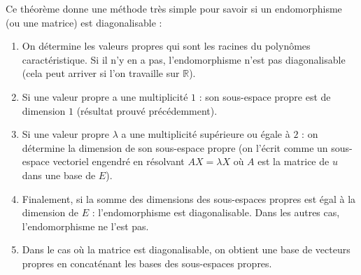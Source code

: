 \documentclass[a4paper,10pt]{report}
\begin{document}
\begin{metho} Ce théorème donne une méthode très simple pour savoir si un endomorphisme (ou une matrice) est diagonalisable :

\begin{enumerate}
\item On détermine les valeurs propres qui sont les racines du polynômes caractéristique. Si il n'y en a pas, l'endomorphisme n'est pas diagonalisable (cela peut arriver si l'on travaille sur $\mathbb{R}$).
\item Si une valeur propre a une multiplicité $1$ : son sous-espace propre est de dimension $1$ (résultat prouvé précédemment).
\item Si une valeur propre $\lambda$ a une multiplicité supérieure ou égale à $2$ : on détermine la dimension de son sous-espace propre (on l'écrit comme un sous-espace vectoriel engendré en résolvant $AX= \lambda X$ où $A$ est la matrice de $u$ dans une base de $E$).
\item Finalement, si la somme des dimensions des sous-espaces propres est égal à la dimension de $E$ : l'endomorphisme est diagonalisable. Dans les autres cas, l'endomorphisme ne l'est pas. 
\item Dans le cas où la matrice est diagonalisable, on obtient une base de vecteurs propres en concaténant les bases des sous-espaces propres.
\end{enumerate}
\end{metho}
\end{document}
